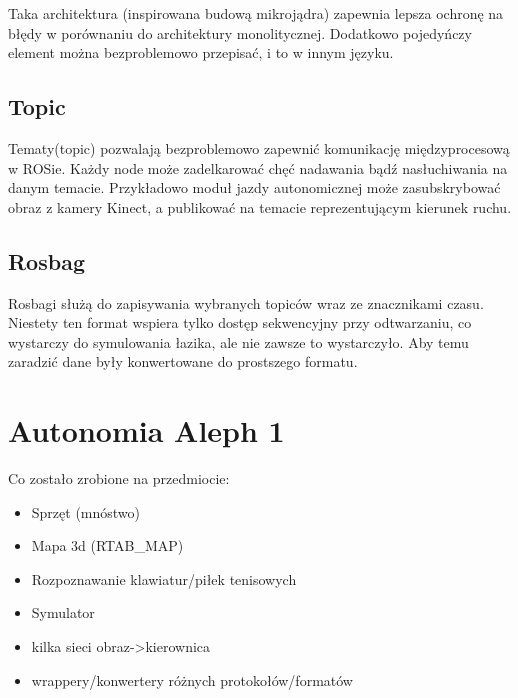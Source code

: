 Taka architektura (inspirowana budową mikrojądra) zapewnia lepsza ochronę na błędy
w porównaniu do architektury monolitycznej. Dodatkowo pojedyńczy element można
bezproblemowo przepisać, i to w innym języku.
\subsection{Topic}
Tematy(topic) pozwalają bezproblemowo zapewnić komunikację międzyprocesową
w ROSie. Każdy node może zadelkarować chęć nadawania bądź nasłuchiwania na
danym temacie. Przykładowo moduł jazdy autonomicznej może zasubskrybować
obraz z kamery Kinect, a publikować na temacie reprezentującym kierunek ruchu.
\subsection{Rosbag}
Rosbagi służą do zapisywania wybranych topiców wraz ze znacznikami czasu.
Niestety ten format wspiera tylko dostęp sekwencyjny przy odtwarzaniu, co wystarczy
do symulowania łazika, ale nie zawsze to wystarczyło. Aby temu zaradzić dane były
konwertowane do prostszego formatu.

\section{Autonomia Aleph 1}
Co zostało zrobione na przedmiocie:
\begin{itemize}
  \item Sprzęt (mnóstwo)
  \item Mapa 3d (RTAB\_MAP)
  \item Rozpoznawanie klawiatur/piłek tenisowych
  \item Symulator
  \item kilka sieci obraz->kierownica
  \item wrappery/konwertery różnych protokołów/formatów
\end{itemize}
